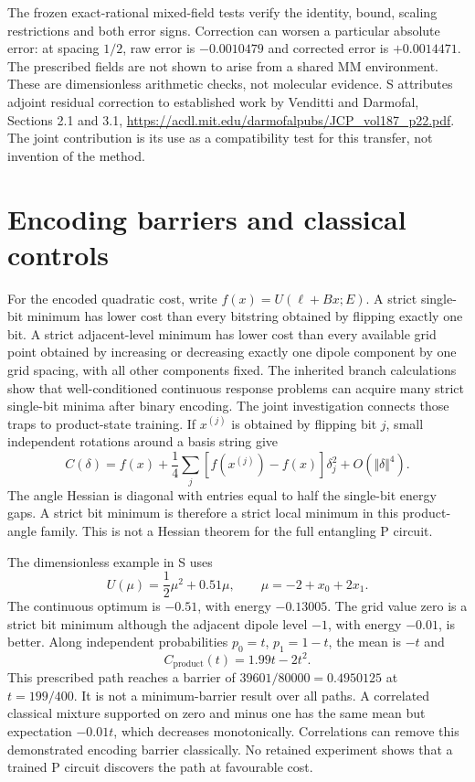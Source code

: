 \documentclass{article}
\begin{document}
The frozen exact-rational mixed-field tests verify the identity, bound, scaling restrictions and both error signs. Correction can worsen a particular absolute error: at spacing $1/2$, raw error is $-0.0010479$ and corrected error is $+0.0014471$. The prescribed fields are not shown to arise from a shared MM environment. These are dimensionless arithmetic checks, not molecular evidence. S attributes adjoint residual correction to established work by Venditti and Darmofal, Sections 2.1 and 3.1, \url{https://acdl.mit.edu/darmofalpubs/JCP_vol187_p22.pdf}. The joint contribution is its use as a compatibility test for this transfer, not invention of the method.

\section{Encoding barriers and classical controls}

For the encoded quadratic cost, write $f(x)=U(\ell+Bx;E)$. A strict single-bit minimum has lower cost than every bitstring obtained by flipping exactly one bit. A strict adjacent-level minimum has lower cost than every available grid point obtained by increasing or decreasing exactly one dipole component by one grid spacing, with all other components fixed. The inherited branch calculations show that well-conditioned continuous response problems can acquire many strict single-bit minima after binary encoding. The joint investigation connects those traps to product-state training. If $x^{(j)}$ is obtained by flipping bit $j$, small independent rotations around a basis string give
\begin{equation}
C(\delta)=f(x)+\frac14\sum_j\left[f(x^{(j)})-f(x)\right]\delta_j^2+O(\Vert\delta\Vert^4).
\end{equation}
The angle Hessian is diagonal with entries equal to half the single-bit energy gaps. A strict bit minimum is therefore a strict local minimum in this product-angle family. This is not a Hessian theorem for the full entangling P circuit.

The dimensionless example in S uses
\begin{equation}
U(\mu)=\frac12\mu^2+0.51\mu,\qquad \mu=-2+x_0+2x_1.
\end{equation}
The continuous optimum is $-0.51$, with energy $-0.13005$. The grid value zero is a strict bit minimum although the adjacent dipole level $-1$, with energy $-0.01$, is better. Along independent probabilities $p_0=t$, $p_1=1-t$, the mean is $-t$ and
\begin{equation}
C_{\mathrm{product}}(t)=1.99t-2t^2.
\end{equation}
This prescribed path reaches a barrier of $39601/80000=0.4950125$ at $t=199/400$. It is not a minimum-barrier result over all paths. A correlated classical mixture supported on zero and minus one has the same mean but expectation $-0.01t$, which decreases monotonically. Correlations can remove this demonstrated encoding barrier classically. No retained experiment shows that a trained P circuit discovers the path at favourable cost.
\end{document}
